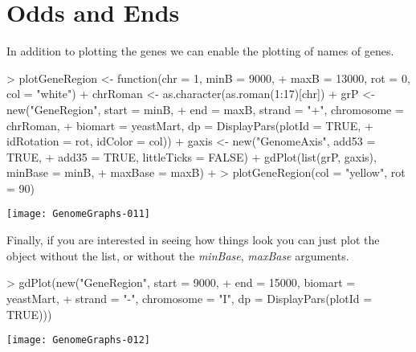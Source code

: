 \documentclass[11pt]{article}
\begin{document}
\section{Odds and Ends}
In addition to plotting the genes we can enable the plotting of names of genes. 

\begin{Schunk}
\begin{Sinput}
> plotGeneRegion <- function(chr = 1, minB = 9000, 
+     maxB = 13000, rot = 0, col = "white") {
+     chrRoman <- as.character(as.roman(1:17)[chr])
+     grP <- new("GeneRegion", start = minB, 
+         end = maxB, strand = "+", chromosome = chrRoman, 
+         biomart = yeastMart, dp = DisplayPars(plotId = TRUE, 
+             idRotation = rot, idColor = col))
+     gaxis <- new("GenomeAxis", add53 = TRUE, 
+         add35 = TRUE, littleTicks = FALSE)
+     gdPlot(list(grP, gaxis), minBase = minB, 
+         maxBase = maxB)
+ }
> plotGeneRegion(col = "yellow", rot = 90)
\end{Sinput}
\end{Schunk}
\texttt{[image: GenomeGraphs-011]}

Finally, if you are interested in seeing how things look you can just
plot the object without the list, or without the \emph{minBase}, \emph{maxBase}
arguments. 
\begin{Schunk}
\begin{Sinput}
> gdPlot(new("GeneRegion", start = 9000, 
+     end = 15000, biomart = yeastMart, 
+     strand = "-", chromosome = "I", dp = DisplayPars(plotId = TRUE)))
\end{Sinput}
\end{Schunk}
\texttt{[image: GenomeGraphs-012]}
\end{document}

